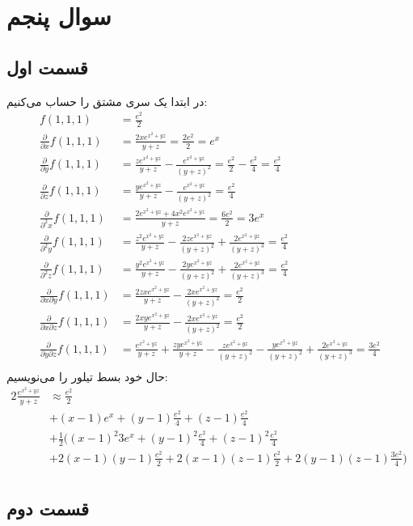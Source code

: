 \documentclass[]{article}
\begin{document}
\section*{سوال پنجم}
\subsection*{قسمت اول}
در ابتدا یک سری مشتق را حساب می‌کنیم:
\begin{align*}
    f(1,1,1) &= \frac{e^{2}}{2}\\
    \frac{\partial}{\partial x} f(1,1,1) &= \frac{2xe^{x^2+yz}}{y + z} = \frac{2e^{2}}{2} = e^x\\
    \frac{\partial}{\partial y} f(1,1,1) &= \frac{ze^{x^2+yz}}{y + z} - \frac{e^{x^2+yz}}{(y + z)^2} = \frac{e^{2}}{2} - \frac{e^{2}}{4} = \frac{e^{2}}{4}\\
    \frac{\partial}{\partial z} f(1,1,1) &= \frac{ye^{x^2+yz}}{y + z} - \frac{e^{x^2+yz}}{(y + z)^2} = \frac{e^{2}}{4}\\
    \frac{\partial}{\partial^2 x} f(1,1,1) &= \frac{2e^{x^2+yz}+4x^2e^{x^2+yz}}{y + z} = \frac{6e^2}{2} = 3e^x\\
    \frac{\partial}{\partial^2 y} f(1,1,1) &= \frac{z^{2} e^{x^{2}+y z}}{y +z}-\frac{2 z e^{x^{2}+y z}}{\left(y +z \right)^{2}}+\frac{2 e^{x^{2}+y z}}{\left(y +z \right)^{3}} = \frac{e^{2}}{4}\\
    \frac{\partial}{\partial^2 z} f(1,1,1) &= \frac{y^{2} e^{x^{2}+y z}}{y +z}-\frac{2 y e^{x^{2}+y z}}{\left(y +z \right)^{2}}+\frac{2 e^{x^{2}+y z}}{\left(y +z \right)^{3}} = \frac{e^{2}}{4}\\
    \frac{\partial}{\partial x \partial y} f(1,1,1) &= \frac{2 z x e^{x^{2}+y z}}{y +z}-\frac{2 x e^{x^{2}+y z}}{\left(y +z \right)^{2}} = \frac{e^{2}}{2}\\
    \frac{\partial}{\partial x \partial z} f(1,1,1) &= \frac{2 x y e^{x^{2}+y z}}{y +z}-\frac{2 x e^{x^{2}+y z}}{\left(y +z \right)^{2}} = \frac{e^{2}}{2}\\
    \frac{\partial}{\partial y \partial z} f(1,1,1) &= \frac{e^{x^{2}+y z}}{y +z}+\frac{z y e^{x^{2}+y z}}{y +z}-\frac{z e^{x^{2}+y z}}{\left(y +z \right)^{2}}-\frac{y e^{x^{2}+y z}}{\left(y +z \right)^{2}}+\frac{2 e^{x^{2}+y z}}{\left(y +z \right)^{3}} = \frac{3e^{2}}{4}\\
\end{align*}
حال خود بسط تیلور را می‌نویسیم:
\begin{align*}{2}
    \frac{e^{x^2+yz}}{y + z} &\approx \frac{e^{2}}{2} &&\\
    &+ (x - 1) e^x + (y - 1) \frac{e^{2}}{4} + (z - 1) \frac{e^{2}}{4}&&\\
    &+ \frac{1}{2} \biggl(\left(x - 1\right)^2 3e^x + \left(y - 1\right)^2 \frac{e^{2}}{4} + \left(z - 1\right)^2 \frac{e^{2}}{4} \\
    &+ 2\left(x - 1\right)\left(y - 1\right) \frac{e^{2}}{2} + 2\left(x - 1\right)\left(z - 1\right) \frac{e^{2}}{2} + 2\left(y - 1\right)\left(z - 1\right) \frac{3e^{2}}{4}\biggr)\\
\end{align*}
\subsection*{قسمت دوم}
\end{document}
